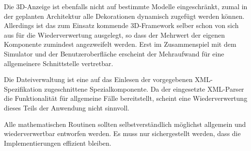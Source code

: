 Die 3D-Anzeige ist ebenfalls nicht auf bestimmte Modelle eingeschränkt, zumal in
der geplanten Architektur alle Dekorationen dynamisch zugefügt werden können.
Allerdings ist das zum Einsatz kommende 3D-Framework selber schon von sich aus 
für die Wiederverwertung ausgelegt, so dass der Mehrwert der eigenen Komponente
zumindest angezweifelt werden. Erst im Zusammenspiel mit dem Simulator und der 
Benutzeroberfläche erscheint der Mehraufwand für eine allgemeinere Schnittstelle
vertretbar.

Die Dateiverwaltung ist eine auf das Einlesen der vorgegebenen XML-Spezifikation 
zugeschnittene Spezialkomponente. Da der eingesetzte XML-Parser die Funktionalität
für allgemeine Fälle bereitstellt, scheint eine Wiederverwertung dieses Teils der
Anwendung nicht sinnvoll.

Alle mathematischen Routinen sollten selbstverständlich möglichst allgemein und
wiederverwertbar entworfen werden. Es muss nur sichergestellt werden, dass die
Implementierungen effizient bleiben.
